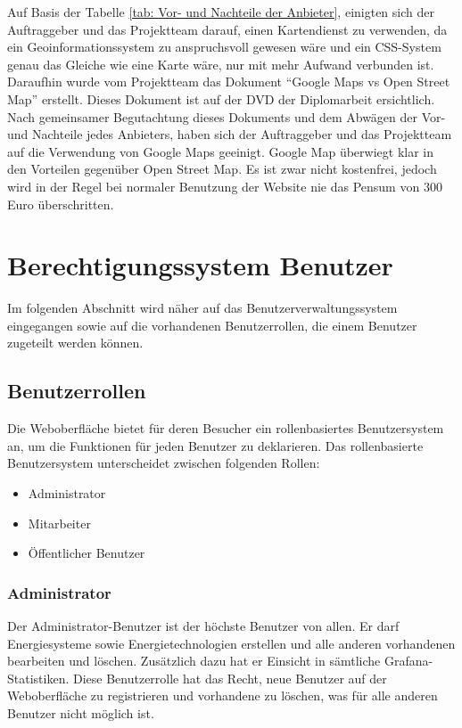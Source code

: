 \newpage
Auf Basis der Tabelle \ref{tab: Vor- und Nachteile der Anbieter}, einigten sich der Auftraggeber und das Projektteam darauf, einen Kartendienst zu verwenden, da ein Geoinformationssystem zu anspruchsvoll gewesen wäre und ein CSS-System genau das Gleiche wie eine Karte wäre, nur mit mehr Aufwand verbunden ist. Daraufhin wurde vom Projektteam das Dokument “Google Maps vs Open Street Map” erstellt. Dieses Dokument ist auf der DVD der Diplomarbeit ersichtlich. Nach gemeinsamer Begutachtung dieses Dokuments und dem Abwägen der Vor- und Nachteile jedes Anbieters, haben sich der Auftraggeber und das Projektteam auf die Verwendung von Google Maps geeinigt. Google Map überwiegt klar in den Vorteilen gegenüber Open Street Map. Es ist zwar nicht kostenfrei, jedoch wird in der Regel bei normaler Benutzung der Website nie das Pensum von 300 Euro überschritten. 
\section{Berechtigungssystem Benutzer}
Im folgenden Abschnitt wird näher auf das Benutzerverwaltungssystem eingegangen sowie auf die vorhandenen Benutzerrollen, die einem Benutzer zugeteilt werden können.

\subsection{Benutzerrollen}
Die Weboberfläche bietet für deren Besucher ein rollenbasiertes Benutzersystem an, um die Funktionen für jeden Benutzer zu deklarieren.
Das rollenbasierte Benutzersystem unterscheidet zwischen folgenden Rollen:

\begin{itemize}
	\item Administrator 
	\item Mitarbeiter
	\item Öffentlicher Benutzer 
\end{itemize}



\subsubsection{Administrator}
Der Administrator-Benutzer ist der höchste Benutzer von allen. Er darf Energiesysteme sowie Energietechnologien erstellen und alle anderen vorhandenen bearbeiten und löschen. Zusätzlich dazu hat er Einsicht in sämtliche Grafana-Statistiken. Diese Benutzerrolle hat das Recht, neue Benutzer auf der Weboberfläche zu registrieren und vorhandene zu löschen, was für alle anderen Benutzer nicht möglich ist.

